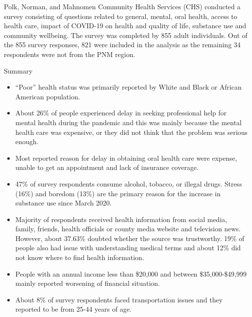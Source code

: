 \documentclass[
  a4paper,
  landscape]{scrreprt}
\begin{document}
Polk, Norman, and Mahnomen Community Health Services (CHS) conducted a
survey consisting of questions related to general, mental, oral health,
access to health care, impact of COVID-19 on health and quality of life,
substance use and community wellbeing. The survey was completed by 855
adult individuals. Out of the 855 survey responses, 821 were included in
the analysis as the remaining 34 respondents were not from the PNM
region.

Summary

\begin{itemize}
\item
  ``Poor'' health status was primarily reported by White and Black or
  African American population.
\item
  About 26\% of people experienced delay in seeking professional help
  for mental health during the pandemic and this was mainly because the
  mental health care was expensive, or they did not think that the
  problem was serious enough.
\item
  Most reported reason for delay in obtaining oral health care were
  expense, unable to get an appointment and lack of insurance coverage.
\item
  47\% of survey respondents consume alcohol, tobacco, or illegal drugs.
  Stress (16\%) and boredom (13\%) are the primary reason for the
  increase in substance use since March 2020.
\item
  Majority of respondents received health information from social media,
  family, friends, health officials or county media website and
  television news. However, about 37.63\% doubted whether the source was
  trustworthy. 19\% of people also had issue with understanding medical
  terms and about 12\% did not know where to find health information.
\item
  People with an annual income less than \$20,000 and between
  \$35,000-\$49,999 mainly reported worsening of financial situation.
\item
  About 8\% of survey respondents faced transportation issues and they
  reported to be from 25-44 years of age.
\end{itemize}
\end{document}
